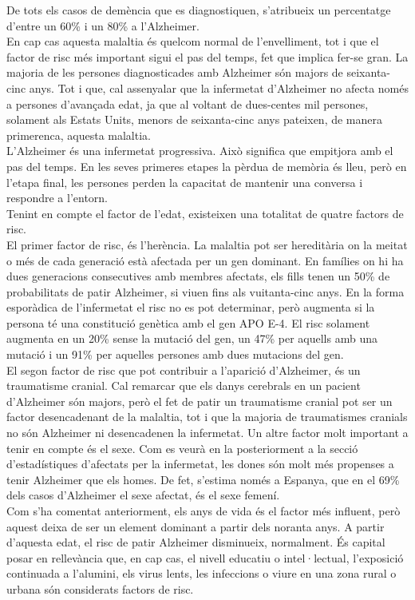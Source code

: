 \documentclass[a4paper,12pt]{article}
\begin{document}
De tots els casos de demència que es diagnostiquen, s'atribueix un percentatge d'entre un 60\% i un 80\% a l'Alzheimer.\\
En cap cas aquesta malaltia és quelcom normal de l'envelliment, tot i que el factor de risc més important sigui el pas del temps, fet que implica fer-se gran. La majoria de les persones diagnosticades amb Alzheimer són majors de seixanta-cinc anys. Tot i que, cal assenyalar que la infermetat d'Alzheimer no afecta només a persones d'avançada edat, ja que al voltant de dues-centes mil persones, solament als Estats Units, menors de seixanta-cinc anys pateixen, de manera primerenca, aquesta malaltia.\\
L'Alzheimer és una infermetat progressiva. Això significa que empitjora amb el pas del temps. En les seves primeres etapes la pèrdua de memòria és lleu, però en l'etapa final, les persones perden la capacitat de mantenir una conversa i respondre a l'entorn.\\
Tenint en compte el factor de l'edat, existeixen una totalitat de quatre factors de risc.\\
El primer factor de risc, és l'herència. La malaltia pot ser hereditària on la meitat o més de cada generació està afectada per un gen dominant. En famílies on hi ha dues generacions consecutives amb membres afectats, els fills tenen un 50\% de probabilitats de patir Alzheimer, si viuen fins als vuitanta-cinc anys. En la forma esporàdica de l'infermetat el risc no es pot determinar, però augmenta si la persona té una constitució genètica amb el gen APO E-4. El risc solament augmenta en un 20\% sense la mutació del gen, un 47\% per aquells amb una mutació i un 91\% per aquelles persones amb dues mutacions del gen.\\
El segon factor de risc que pot contribuir a l'aparició d'Alzheimer, és un traumatisme cranial. Cal remarcar que els danys cerebrals en un pacient d'Alzheimer són majors, però el fet de patir un traumatisme cranial pot ser un factor desencadenant de la malaltia, tot i que la majoria de traumatismes cranials no són Alzheimer ni desencadenen la infermetat.
Un altre factor molt important a tenir en compte és el sexe. Com es veurà en la posteriorment a la secció d'estadístiques d'afectats per la infermetat, les dones són molt més propenses a tenir Alzheimer que els homes. De fet, s'estima només a Espanya, que en el 69\% dels casos d'Alzheimer el sexe afectat, és el sexe femení.\\
Com s'ha comentat anteriorment, els anys de vida és el factor més influent, però aquest deixa de ser un element dominant a partir dels noranta anys. A partir d'aquesta edat, el risc de patir Alzheimer disminueix, normalment. És capital posar en rellevància que, en cap cas, el nivell educatiu o intel·lectual, l'exposició continuada a l'alumini, els virus lents, les infeccions o viure en una zona rural o urbana són considerats factors de risc.
\end{document}
